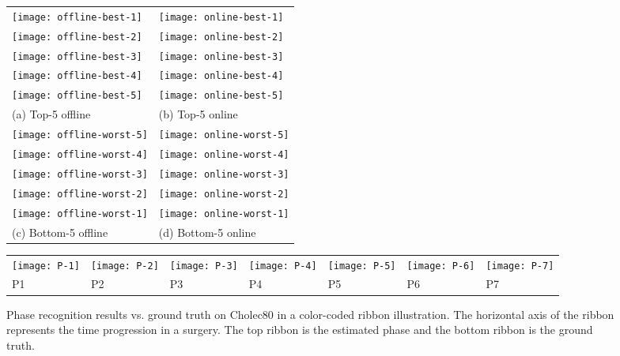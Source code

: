\documentclass[journal]{IEEEtran} \usepackage{amssymb}
\begin{document}
\begin{figure}
\begin{centering}
\begin{tabular}{@{}C{4.2cm}C{4.2cm}@{}}
\texttt{[image: offline-best-1]} & \texttt{[image: online-best-1]}\tabularnewline
\texttt{[image: offline-best-2]} & \texttt{[image: online-best-2]}\tabularnewline
\texttt{[image: offline-best-3]} & \texttt{[image: online-best-3]}\tabularnewline
\texttt{[image: offline-best-4]} & \texttt{[image: online-best-4]}\tabularnewline
\texttt{[image: offline-best-5]} & \texttt{[image: online-best-5]}\tabularnewline
{\scriptsize (a) Top-5 offline} & {\scriptsize (b) Top-5 online}\tabularnewline
\texttt{[image: offline-worst-5]} & \texttt{[image: online-worst-5]}\tabularnewline
\texttt{[image: offline-worst-4]} & \texttt{[image: online-worst-4]}\tabularnewline
\texttt{[image: offline-worst-3]} & \texttt{[image: online-worst-3]}\tabularnewline
\texttt{[image: offline-worst-2]} & \texttt{[image: online-worst-2]}\tabularnewline
\texttt{[image: offline-worst-1]} & \texttt{[image: online-worst-1]}\tabularnewline
{\scriptsize (c) Bottom-5 offline} & {\scriptsize (d) Bottom-5 online}\tabularnewline
\end{tabular}

\begin{tabular}{@{}C{1cm}C{1cm}C{1cm}C{1cm}C{1cm}C{1cm}C{1cm}@{}}
\texttt{[image: P-1]} &
\texttt{[image: P-2]} &
\texttt{[image: P-3]} &
\texttt{[image: P-4]} &
\texttt{[image: P-5]} &
\texttt{[image: P-6]} &
\texttt{[image: P-7]} \tabularnewline
{\scriptsize P1} & {\scriptsize P2} & {\scriptsize P3} & {\scriptsize P4} & {\scriptsize P5} & {\scriptsize P6} & {\scriptsize P7} \tabularnewline
\end{tabular}
\par\end{centering}

\caption{Phase recognition results vs. ground truth on Cholec80 in a color-coded ribbon illustration. The horizontal axis of the ribbon represents the time progression in a surgery. The top ribbon is the estimated phase and the bottom ribbon is the ground truth. \label{fig:color-coded} }


\end{figure}
\end{document}
